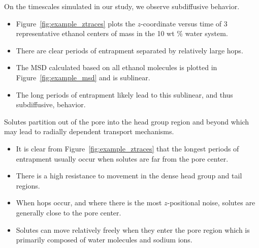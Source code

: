 \documentclass{article}
\begin{document}
  \noindent On the timescales simulated in our study, we observe subdiffusive behavior.
  \begin{itemize}  
    \item Figure~\ref{fig:example_ztraces} plots the $z$-coordinate versus time of
  	3 representative ethanol centers of mass in the 10 wt \% water system.
  	\item There are clear periods of entrapment separated by relatively large hops.
	\item The MSD calculated based on all ethanol molecules is plotted in 
	Figure~\ref{fig:example_msd} and is sublinear.
	\item The long periods of entrapment likely lead to this sublinear, and thus
	subdiffusive, behavior.
  \end{itemize}
  
  Solutes partition out of the pore into the head group region and beyond which
  may lead to radially dependent transport mechanisms.
  \begin{itemize}
    \item It is clear from Figure~\ref{fig:example_ztraces} that the longest 
    periods of entrapment usually occur when solutes are far from the pore
    center.
    \item There is a high resistance to movement in the dense head group and
    tail regions.
    \item When hops occur, and where there is the most $z$-positional noise, 
    solutes are generally close to the pore center.
    \item Solutes can move relatively freely when they enter the pore region
    which is primarily composed of water molecules and sodium ions.
  \end{itemize}
  
\end{document}

